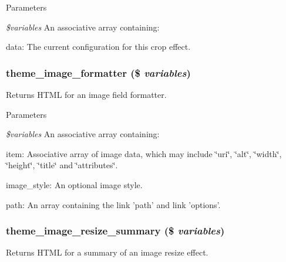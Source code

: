 \begin{DoxyParams}{Parameters}
\item[{\em \$variables}]An associative array containing:
\begin{DoxyItemize}
\item data: The current configuration for this crop effect. 
\end{DoxyItemize}\end{DoxyParams}
\hypertarget{group__themeable_gac8bbf1cd8217fe56a699148d8713e09e}{
\subsubsection[{theme\_\-image\_\-formatter}]{\setlength{\rightskip}{0pt plus 5cm}theme\_\-image\_\-formatter (\$ {\em variables})}}
\label{group__themeable_gac8bbf1cd8217fe56a699148d8713e09e}
Returns HTML for an image field formatter.


\begin{DoxyParams}{Parameters}
\item[{\em \$variables}]An associative array containing:
\begin{DoxyItemize}
\item item: Associative array of image data, which may include \char`\"{}uri\char`\"{}, \char`\"{}alt\char`\"{}, \char`\"{}width\char`\"{}, \char`\"{}height\char`\"{}, \char`\"{}title\char`\"{} and \char`\"{}attributes\char`\"{}.
\item image\_\-style: An optional image style.
\item path: An array containing the link 'path' and link 'options'. 
\end{DoxyItemize}\end{DoxyParams}
\hypertarget{group__themeable_ga19f204a2137d1fdd8fe4183a047f94ef}{
\subsubsection[{theme\_\-image\_\-resize\_\-summary}]{\setlength{\rightskip}{0pt plus 5cm}theme\_\-image\_\-resize\_\-summary (\$ {\em variables})}}
\label{group__themeable_ga19f204a2137d1fdd8fe4183a047f94ef}
Returns HTML for a summary of an image resize effect.


